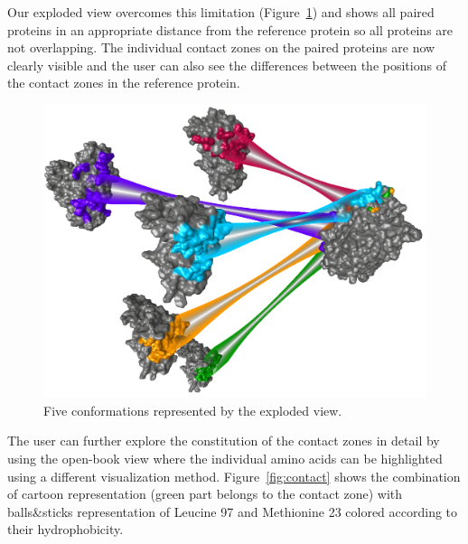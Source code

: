 \documentclass[journal]{vgtc}                %
\begin{document}
Our exploded view overcomes this limitation (Figure~\ref{fig:case2}) and shows all paired proteins in an appropriate distance from the reference protein so all proteins are not overlapping.
The individual contact zones on the paired proteins are now clearly visible and the user can also see the differences between the positions of the contact zones in the reference protein.

\begin{figure}[bt]
  \centering
  \includegraphics[width=1.0\columnwidth]{case2.png}
  \caption{Five conformations represented by the exploded view.}
  \label{fig:case2}
\end{figure}

The user can further explore the constitution of the contact zones in detail by using the open-book view where the individual amino acids can be highlighted using a different visualization method. 
Figure~\ref{fig:contact} shows the combination of cartoon representation (green part belongs to the contact zone) with balls\&sticks representation of Leucine 97 and Methionine 23 colored according to their hydrophobicity.
\end{document}
